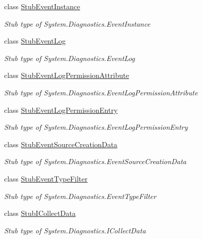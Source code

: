 \begin{DoxyCompactItemize}
class \hyperlink{class_system_1_1_diagnostics_1_1_fakes_1_1_stub_event_instance}{Stub\-Event\-Instance}
\begin{DoxyCompactList}\small\item\em Stub type of System.\-Diagnostics.\-Event\-Instance\end{DoxyCompactList}\item 
class \hyperlink{class_system_1_1_diagnostics_1_1_fakes_1_1_stub_event_log}{Stub\-Event\-Log}
\begin{DoxyCompactList}\small\item\em Stub type of System.\-Diagnostics.\-Event\-Log\end{DoxyCompactList}\item 
class \hyperlink{class_system_1_1_diagnostics_1_1_fakes_1_1_stub_event_log_permission_attribute}{Stub\-Event\-Log\-Permission\-Attribute}
\begin{DoxyCompactList}\small\item\em Stub type of System.\-Diagnostics.\-Event\-Log\-Permission\-Attribute\end{DoxyCompactList}\item 
class \hyperlink{class_system_1_1_diagnostics_1_1_fakes_1_1_stub_event_log_permission_entry}{Stub\-Event\-Log\-Permission\-Entry}
\begin{DoxyCompactList}\small\item\em Stub type of System.\-Diagnostics.\-Event\-Log\-Permission\-Entry\end{DoxyCompactList}\item 
class \hyperlink{class_system_1_1_diagnostics_1_1_fakes_1_1_stub_event_source_creation_data}{Stub\-Event\-Source\-Creation\-Data}
\begin{DoxyCompactList}\small\item\em Stub type of System.\-Diagnostics.\-Event\-Source\-Creation\-Data\end{DoxyCompactList}\item 
class \hyperlink{class_system_1_1_diagnostics_1_1_fakes_1_1_stub_event_type_filter}{Stub\-Event\-Type\-Filter}
\begin{DoxyCompactList}\small\item\em Stub type of System.\-Diagnostics.\-Event\-Type\-Filter\end{DoxyCompactList}\item 
class \hyperlink{class_system_1_1_diagnostics_1_1_fakes_1_1_stub_i_collect_data}{Stub\-I\-Collect\-Data}
\begin{DoxyCompactList}\small\item\em Stub type of System.\-Diagnostics.\-I\-Collect\-Data\end{DoxyCompactList}\item 

\end{DoxyCompactItemize}
